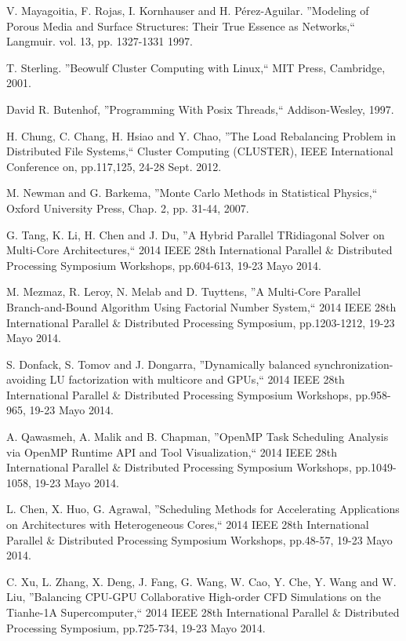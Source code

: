 \begin{thebibliography}{9}
V. Mayagoitia, F. Rojas, I. Kornhauser and H. Pérez-Aguilar. ''Modeling of Porous Media and Surface Structures: Their True Essence as Networks,`` Langmuir. vol. 13, pp. 1327-1331 1997.

 T. Sterling. ''Beowulf Cluster Computing with Linux,`` MIT Press, Cambridge, 2001.

David R. Butenhof, ''Programming With Posix Threads,`` Addison-Wesley, 1997.

H. Chung, C. Chang, H. Hsiao and Y. Chao, ''The Load Rebalancing Problem in Distributed File Systems,`` Cluster Computing (CLUSTER), IEEE International Conference on, pp.117,125, 24-28 Sept. 2012.

M. Newman and G. Barkema, ''Monte Carlo Methods in Statistical Physics,`` Oxford University Press, Chap. 2, pp. 31-44, 2007.

G. Tang, K. Li, H. Chen and J. Du, ''A Hybrid Parallel TRidiagonal Solver on Multi-Core Architectures,`` 2014 IEEE 28th International Parallel $\&$ Distributed Processing Symposium Workshops, pp.604-613, 19-23 Mayo 2014.

M. Mezmaz, R. Leroy, N. Melab and D. Tuyttens, ''A Multi-Core Parallel Branch-and-Bound Algorithm Using Factorial Number System,`` 2014 IEEE 28th International Parallel $\&$ Distributed Processing Symposium, pp.1203-1212, 19-23 Mayo 2014.

S. Donfack, S. Tomov and J. Dongarra, ''Dynamically balanced synchronization-avoiding LU factorization with multicore and GPUs,`` 2014 IEEE 28th International Parallel $\&$ Distributed Processing Symposium Workshops, pp.958-965, 19-23 Mayo 2014.

A. Qawasmeh, A. Malik and B. Chapman, ''OpenMP Task Scheduling Analysis via OpenMP Runtime API and Tool Visualization,`` 2014 IEEE 28th International Parallel $\&$ Distributed Processing Symposium Workshops, pp.1049-1058, 19-23 Mayo 2014.

L. Chen, X. Huo, G. Agrawal, ''Scheduling Methods for Accelerating Applications on Architectures with Heterogeneous Cores,`` 2014 IEEE 28th International Parallel $\&$ Distributed Processing Symposium Workshops, pp.48-57, 19-23 Mayo 2014.

C. Xu, L. Zhang, X. Deng, J. Fang, G. Wang, W. Cao, Y. Che, Y. Wang and W. Liu, ''Balancing CPU-GPU Collaborative High-order CFD Simulations on the Tianhe-1A Supercomputer,`` 2014 IEEE 28th International Parallel $\&$ Distributed Processing Symposium, pp.725-734, 19-23 Mayo 2014.


\end{thebibliography}
